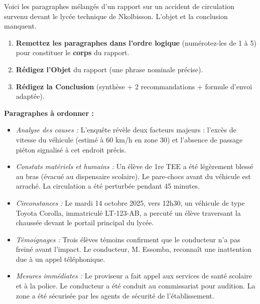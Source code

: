 \documentclass[11pt]{article}
\begin{document}
\begin{exercice}
Voici les paragraphes mélangés d'un rapport sur un accident de circulation survenu devant le lycée technique de Nkolbisson. L'objet et la conclusion manquent.
\begin{enumerate}
    \item \textbf{Remettez les paragraphes dans l'ordre logique} (numérotez-les de 1 à 5) pour constituer le \textbf{corps} du rapport.
    \item \textbf{Rédigez l'Objet} du rapport (une phrase nominale précise).
    \item \textbf{Rédigez la Conclusion} (synthèse + 2 recommandations + formule d'envoi adaptée).
\end{enumerate}
\textbf{Paragraphes à ordonner :}
\begin{itemize}
    \item[A.] \emph{Analyse des causes :} L'enquête révèle deux facteurs majeurs : l'excès de vitesse du véhicule (estimé à 60 km/h en zone 30) et l'absence de passage piéton signalisé à cet endroit précis.
    \item[B.] \emph{Constats matériels et humains :} Un élève de 1re TEE a été légèrement blessé au bras (évacué au dispensaire scolaire). Le pare-chocs avant du véhicule est arraché. La circulation a été perturbée pendant 45 minutes.
    \item[C.] \emph{Circonstances :} Le mardi 14 octobre 2025, vers 12h30, un véhicule de type Toyota Corolla, immatriculé LT-123-AB, a percuté un élève traversant la chaussée devant le portail principal du lycée.
    \item[D.] \emph{Témoignages :} Trois élèves témoins confirment que le conducteur n'a pas freiné avant l'impact. Le conducteur, M. Essomba, reconnaît une inattention due à un appel téléphonique.
    \item[E.] \emph{Mesures immédiates :} Le proviseur a fait appel aux services de santé scolaire et à la police. Le conducteur a été conduit au commissariat pour audition. La zone a été sécurisée par les agents de sécurité de l'établissement.
\end{itemize}
\end{exercice}
\end{document}
